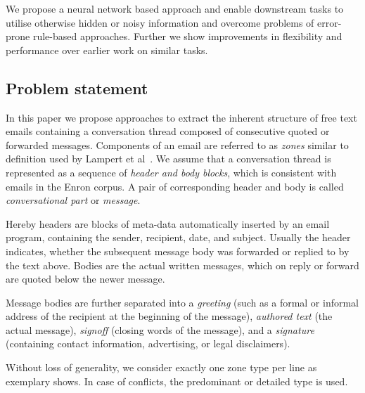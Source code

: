 \documentclass{llncs}
\begin{document}
We propose a neural network based approach and enable downstream tasks to utilise otherwise hidden or noisy information and overcome problems of error-prone rule-based approaches.
Further we show improvements in flexibility and performance over earlier work on similar tasks.









\subsection{Problem statement}
In this paper we propose approaches to extract the inherent structure of free text emails containing a conversation thread composed of consecutive quoted or forwarded messages.
Components of an email are referred to as \textit{zones} similar to definition used by Lampert et al~\cite{zones}.
We assume that a conversation thread is represented as a sequence of \textit{header and body blocks}, which is consistent with emails in the Enron corpus.
A pair of corresponding header and body is called \textit{conversational part} or \textit{message}.

Hereby headers are blocks of meta-data automatically inserted by an email program, containing the sender, recipient, date, and subject.
Usually the header indicates, whether the subsequent message body was forwarded or replied to by the text above.
Bodies are the actual written messages, which on reply or forward are quoted below the newer message.

Message bodies are further separated into a \textit{greeting} (such as a formal or informal address of the recipient at the beginning of the message), \textit{authored text} (the actual message), \textit{signoff} (closing words of the message), and a \textit{signature} (containing contact information, advertising, or legal disclaimers).

Without loss of generality, we consider exactly one zone type per line as  exemplary shows.
In case of conflicts, the predominant or detailed type is used.
\end{document}
